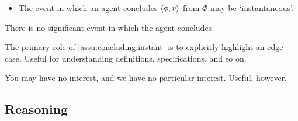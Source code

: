 \begin{note}
  \begin{assumption}
    \label{assu:concluding:instant}

    \begin{itemize}
    \item
      The event in which an agent concludes \(\langle \phi, v \rangle\) from \(\Phi\) may be `instantaneous'.
    \end{itemize}
    \vspace{-\baselineskip}
  \end{assumption}

  There is no significant event in which the agent concludes.

  The primary role of \autoref{assu:concluding:instant} is to explicitly highlight an edge case.
  Useful for understanding definitions, specifications, and so on.

  You may have no interest, and we have no particular interest.
  Useful, however.
\end{note}

\subsection{Reasoning}
\label{sec:reasoniing}

